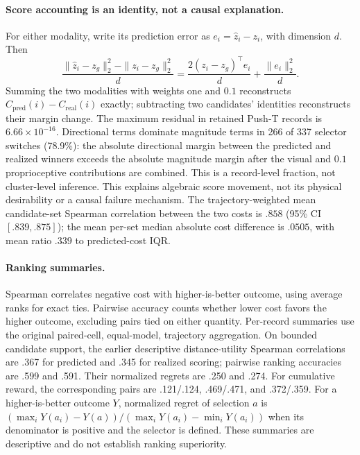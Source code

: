 \documentclass{article}
\begin{document}
\paragraph{Score accounting is an identity, not a causal explanation.}
For either modality, write its prediction error as $e_i=\hat z_i-z_i$, with
dimension $d$. Then
\begin{equation}
 \frac{\|\hat z_i-z_g\|_2^2-\|z_i-z_g\|_2^2}{d}
 =\frac{2(z_i-z_g)^\top e_i}{d}+\frac{\|e_i\|_2^2}{d}.
 \label{eq:identity}
\end{equation}
Summing the two modalities with weights one and $0.1$ reconstructs
$C_{\mathrm{pred}}(i)-C_{\mathrm{real}}(i)$ exactly; subtracting two candidates'
identities reconstructs their margin change. The maximum residual in retained
Push-T records is $6.66\times10^{-16}$. Directional terms dominate magnitude
terms in 266 of 337 selector switches (78.9\%): the absolute directional
margin between the predicted and realized winners exceeds the absolute
magnitude margin after the visual and $0.1$ proprioceptive contributions are
combined. This is a record-level fraction, not cluster-level inference.
This explains algebraic score
movement, not its physical desirability or a causal failure mechanism.
The trajectory-weighted mean candidate-set Spearman correlation between the
two costs is $.858$ (95\% CI $[.839,.875]$); the mean per-set median absolute
cost difference is $.0505$, with mean ratio $.339$ to predicted-cost IQR.

\paragraph{Ranking summaries.}
Spearman correlates negative cost with higher-is-better outcome, using average
ranks for exact ties. Pairwise accuracy counts whether lower cost favors the
higher outcome, excluding pairs tied on either quantity. Per-record summaries
use the original paired-cell, equal-model, trajectory aggregation.
On bounded candidate support, the earlier descriptive distance-utility
Spearman correlations are .367 for predicted and .345 for realized scoring;
pairwise ranking accuracies are .599 and .591. Their normalized regrets are
.250 and .274. For cumulative reward, the corresponding pairs are .121/.124,
.469/.471, and .372/.359. For a higher-is-better outcome $Y$, normalized
regret of selection $a$ is
$(\max_iY(a_i)-Y(a))/(\max_iY(a_i)-\min_iY(a_i))$ when its denominator is
positive and the selector is defined. These summaries are descriptive and
do not establish ranking superiority.
\end{document}
